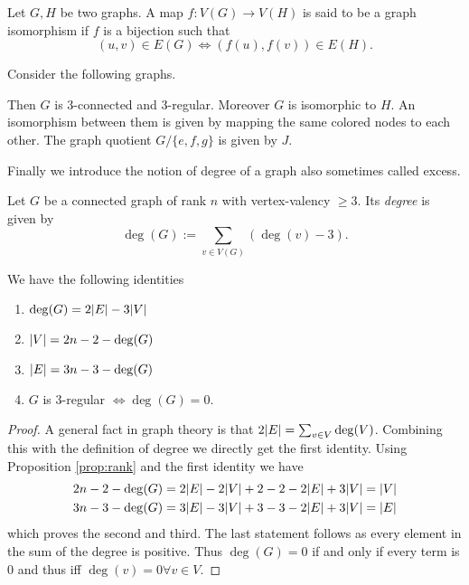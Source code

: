 \begin{definition}
	Let $G,H$ be two graphs. A map $f: V(G) \to V(H)$ is said to be a graph isomorphism if $f$ is a bijection such that
	\[
		(u,v) \in E(G) \Leftrightarrow (f(u),f(v)) \in E(H)
	.\] 
\end{definition}

\begin{eg}\label{ex:gAuto}
	Consider the following graphs.

	Then $G$ is $3$-connected and $3$-regular. Moreover $G$ is isomorphic to $H$.
	An isomorphism between them is given by mapping the same colored nodes to each other.
	The graph quotient $G / \{e,f,g\}$ is given by $J$.
\end{eg}

Finally we introduce the notion of degree of a graph also sometimes called excess.
\begin{definition}
	Let $G$ be a connected graph of rank $n$ with vertex-valency $\geq 3$. Its \emph{degree} is given by
	\[
		\deg(G) := \sum_{v \in V(G)} (\deg(v) - 3)
	.\] 
\end{definition}

\begin{proposition}
	We have the following identities
	\begin{enumerate}
		\item $\deg(G) = 2 \abs{E} - 3 \abs{V}$
		\item $\abs{V} = 2n -2 - \deg(G)$
		\item $\abs{E} = 3n - 3 - \deg(G)$
		\item $G$ is $3$-regular $\Leftrightarrow \deg(G) = 0$.
	\end{enumerate}	
\end{proposition}

\begin{proof}
	A general fact in graph theory is that $2 \abs{E} = \sum_{v \in V} \deg(V)$.
	Combining this with the definition of degree we directly get the first identity.
	Using Proposition \ref{prop:rank} and the first identity we have
	\begin{align*}
		2 n -2 - \deg(G) &= 2 \abs{E} - 2 \abs{V} + 2 - 2 - 2\abs{E} + 3 \abs{V} = \abs{V}\\
		3 n -3 - \deg(G) &= 3 \abs{E} - 3 \abs{V} + 3 - 3 - 2\abs{E} + 3 \abs{V} = \abs{E}
	\end{align*}
	which proves the second and third. The last statement follows as every element in the sum of the degree is positive.
	Thus $\deg(G) = 0$ if and only if every term is $0$ and thus iff $\deg(v) = 0 \forall v \in V$.
\end{proof}

